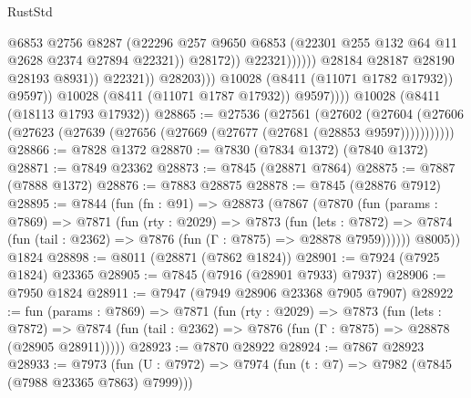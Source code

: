 \begin{lexlean}{RustStd}
\begin{coremodule}
                                              @6853
                                              @2756
                                              @8287
                                              (@22296
                                                @257
                                                @9650
                                                @6853
                                                (@22301
                                                  @255
                                                  @132
                                                  @64
                                                  @11
                                                  @2628
                                                  @2374
                                                  @27894
                                                  @22321))
                                              @28172))
                                          @22321))))))
                              @28184
                              @28187
                              @28190
                              @28193
                              @8931))
                          @22321))
                      @28203)))
                @10028
                (@8411 (@11071 @1782 @17932))
                @9597))
            @10028
            (@8411 (@11071 @1787 @17932))
            @9597))))
    @10028
    (@8411 (@18113 @1793 @17932))
@28865 := @27536
    (@27561
      (@27602
        (@27604 (@27606 (@27623 (@27639 (@27656 (@27669 (@27677 (@27681 (@28853 @9597)))))))))))
@28866 := @7828 @1372
@28870 := @7830 (@7834 @1372) (@7840 @1372)
@28871 := @7849 @23362
@28873 := @7845 (@28871 @7864)
@28875 := @7887 (@7888 @1372)
@28876 := @7883 @28875
@28878 := @7845 (@28876 @7912)
@28895 := @7844
    (fun (fn : @91) =>
    @28873
      (@7867
        (@7870
          (fun (params : @7869) =>
          @7871
            (fun (rty : @2029) =>
            @7873
              (fun (lets : @7872) =>
              @7874 (fun (tail : @2362) => @7876 (fun (Γ : @7875) => @28878 @7959))))))
        @8005))
    @1824
@28898 := @8011 (@28871 (@7862 @1824))
@28901 := @7924 (@7925 @1824) @23365
@28905 := @7845 (@7916 (@28901 @7933) @7937)
@28906 := @7950 @1824
@28911 := @7947 (@7949 @28906 @23368 @7905 @7907)
@28922 := fun (params : @7869) =>
  @7871
    (fun (rty : @2029) =>
    @7873
      (fun (lets : @7872) =>
      @7874 (fun (tail : @2362) => @7876 (fun (Γ : @7875) => @28878 (@28905 @28911)))))
@28923 := @7870 @28922
@28924 := @7867 @28923
@28933 := @7973
    (fun (U : @7972) => @7974 (fun (t : @7) => @7982 (@7845 (@7988 @23365 @7863) @7999)))

\end{coremodule}
\end{lexlean}
